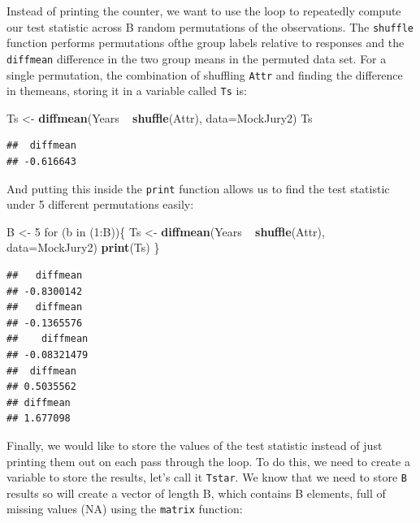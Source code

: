 \documentclass[]{book}
\newenvironment{Shaded}{\begin{snugshade}}{\end{snugshade}}
\newcommand{\KeywordTok}[1]{\textcolor[rgb]{0.13,0.29,0.53}{\textbf{{#1}}}}
\newcommand{\DataTypeTok}[1]{\textcolor[rgb]{0.13,0.29,0.53}{{#1}}}
\newcommand{\DecValTok}[1]{\textcolor[rgb]{0.00,0.00,0.81}{{#1}}}
\newcommand{\StringTok}[1]{\textcolor[rgb]{0.31,0.60,0.02}{{#1}}}
\newcommand{\NormalTok}[1]{{#1}}
\begin{document}
Instead of printing the counter, we want to use the loop to repeatedly
compute our test statistic across B random permutations of the
observations. The \texttt{shuffle} function performs permutations ofthe
group labels relative to responses and the \texttt{diffmean} difference
in the two group means in the permuted data set. For a single
permutation, the combination of shuffling \texttt{Attr} and finding the
difference in themeans, storing it in a variable called \texttt{Ts} is:

\begin{Shaded}
\begin{Highlighting}[]
\NormalTok{Ts <-}\StringTok{ }\KeywordTok{diffmean}\NormalTok{(Years ~}\StringTok{ }\KeywordTok{shuffle}\NormalTok{(Attr), }\DataTypeTok{data=}\NormalTok{MockJury2)}
\NormalTok{Ts}
\end{Highlighting}
\end{Shaded}

\begin{verbatim}
##  diffmean 
## -0.616643
\end{verbatim}

And putting this inside the \texttt{print} function allows us to find
the test statistic under 5 different permutations easily:

\begin{Shaded}
\begin{Highlighting}[]
\NormalTok{B <-}\StringTok{ }\DecValTok{5}
\NormalTok{for (b in (}\DecValTok{1}\NormalTok{:B))\{}
  \NormalTok{Ts <-}\StringTok{ }\KeywordTok{diffmean}\NormalTok{(Years ~}\StringTok{ }\KeywordTok{shuffle}\NormalTok{(Attr), }\DataTypeTok{data=}\NormalTok{MockJury2)}
  \KeywordTok{print}\NormalTok{(Ts)}
\NormalTok{\}}
\end{Highlighting}
\end{Shaded}

\begin{verbatim}
##   diffmean 
## -0.8300142 
##   diffmean 
## -0.1365576 
##    diffmean 
## -0.08321479 
##  diffmean 
## 0.5035562 
## diffmean 
## 1.677098
\end{verbatim}

Finally, we would like to store the values of the test statistic instead
of just printing them out on each pass through the loop. To do this, we
need to create a variable to store the results, let's call it
\texttt{Tstar}. We know that we need to store \texttt{B} results so will
create a vector of length B, which contains B elements, full of missing
values (NA) using the \texttt{matrix} function:
\end{document}
